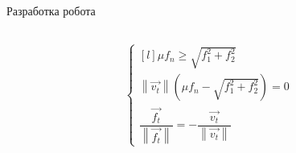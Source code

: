 \documentclass[aspectratio=169,xcolor=table]{beamer}
\begin{document}
\begin{frame}[t]{Разработка робота}
\begin{columns}[T,onlytextwidth]
\begin{column}{0.29\textwidth}
\begin{figure}[H]
                    \label{fig:contact_interaction.png}
                \end{figure}
                \vspace{-1cm}
                \begin{align*}
                \left\{\begin{matrix*}[l]
                \mu f_n \geqslant \sqrt{f_1^2 + f_2^2}\\ 
                \left\lVert \vec{v_t}\right\rVert (\mu f_n - \sqrt{f_1^2 + f_2^2}) = 0\\
                \dfrac{\vec{f_t}}{\left\lVert \vec{f_t}\right\rVert } = - \dfrac{\vec{v_t}}{\left\lVert \vec{v_t}\right\rVert }
                \end{matrix*}\right.
                \end{align*}
            \end{column}
        \end{columns}
    \end{frame}
\end{document}
